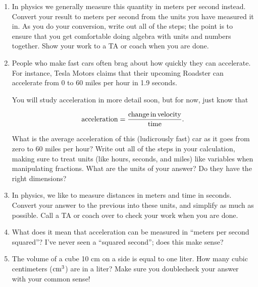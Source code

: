 \documentclass[12pt]{article}
\begin{document}
\begin{enumerate}
\item In physics we generally measure this quantity in meters per second instead. 
Convert your result to meters per second from the units you have measured it in. As you do your conversion, write out all of the 
steps; the point is to ensure that you get comfortable doing algebra with units and numbers together. Show your work to a TA
or coach when you are done.

\vspace{3in}

\newpage


\item People who make fast cars often brag about how quickly they can accelerate. For instance, Tesla Motors claims that
their upcoming Roadster can accelerate from 0 to 60 miles per hour in 1.9 seconds. 

You will study acceleration in more detail soon, but for now, just know that

$$
{\rm acceleration} = \frac{\rm change\, in\, velocity}{\rm time}.
$$

What is the average acceleration of this (ludicrously fast) car as it goes from zero to 60 miles per hour? Write out all of the
steps in your calculation, making sure to treat units (like hours, seconds, and miles) like variables when manipulating fractions.
What are the units of your answer? Do they have the right dimensions?

\vspace{2in}

\item In physics, we like to measure distances in meters and time in seconds. Convert your answer to the previous into these
units, and simplify as much as possible. Call a TA or coach over to check your work when you are done.

\vspace{2in}

\item What does it mean that acceleration can be measured in ``meters per second squared''? I've never seen a ``squared second'';
does this make sense?

\vspace{1in}

\item The volume of a cube 10 cm on a side is equal to one liter. How many cubic centimeters (${\rm cm}^3$) are in a liter?
Make sure you doublecheck your answer with your common sense!

\newpage

\end{enumerate}
\end{document}
